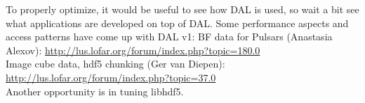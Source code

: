 \documentclass[a4paper,11pt]{article}
\begin{document}
\begin{enumerate}[label=\it D.\arabic{*}]
To properly optimize, it would be useful to see how DAL is used, so wait a bit see what applications are developed on top of DAL.
Some performance aspects and access patterns have come up with DAL v1:
BF data for Pulsars (Anastasia Alexov): \url{http://lus.lofar.org/forum/index.php?topic=180.0}\\
Image cube data, hdf5 chunking (Ger van Diepen): \url{http://lus.lofar.org/forum/index.php?topic=37.0}\\

Another opportunity is in tuning libhdf5.





\end{enumerate}
\end{document}
